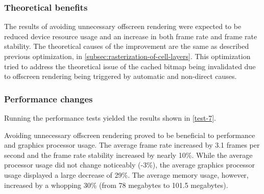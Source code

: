 \documentclass[a4paper,12pt]{article}
\begin{document}
\subsubsection{Theoretical benefits}
The results of avoiding unnecessary offscreen rendering were expected to be reduced device resource usage and an increase in both frame rate and frame rate stability. The theoretical causes of the improvement are the same as described previous optimization, in \autoref{subsec:rasterization-of-cell-layers}. This optimization tried to address the theoretical issue of the cached bitmap being invalidated due to offscreen rendering being triggered by automatic and non-direct causes.\cite{MovingPixelsOntoTheScreen}

\subsubsection{Performance changes}
Running the performance tests yielded the results shown in \autoref{test-7}.

Avoiding unnecessary offscreen rendering proved to be beneficial to performance and graphics processor usage. The average frame rate increased by 3.1 frames per second and the frame rate stability increased by nearly 10\%. While the average processor usage did not change noticeably (-3\%), the average graphics processor usage displayed a large decrease of 29\%. The average memory usage, however, increased by a whopping 30\% (from 78 megabytes to 101.5 megabytes).
\end{document}
